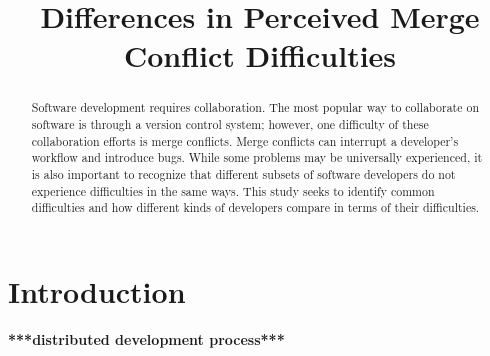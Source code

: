 \documentclass[conference]{IEEEtran}
\begin{document}
%
\title{Differences in Perceived Merge Conflict Difficulties}

\author{
}

\maketitle

\begin{abstract}
Software development requires collaboration. The most popular way to collaborate on software is through a version control system; however, one difficulty of these collaboration efforts is merge conflicts. Merge conflicts can interrupt a developer's workflow and introduce bugs. While some problems may be universally experienced, it is also important to recognize that different subsets of software developers do not experience difficulties in the same ways. This study seeks to identify common difficulties and how different kinds of developers compare in terms of their difficulties.
\end{abstract}





%
\IEEEpeerreviewmaketitle



\section{Introduction}
\textbf{***distributed development process***}
\end{document}
